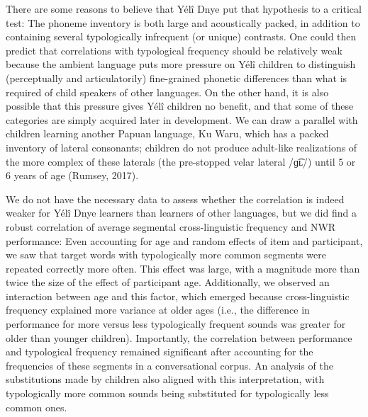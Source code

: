 \documentclass[
  american,
  ,man,floatsintext]{apa6}
\begin{document}
There are some reasons to believe that Yélî Dnye put that hypothesis to a critical test: The phoneme inventory is both large and acoustically packed, in addition to containing several typologically infrequent (or unique) contrasts. One could then predict that correlations with typological frequency should be relatively weak because the ambient language puts more pressure on Yélî children to distinguish (perceptually and articulatorily) fine-grained phonetic differences than what is required of child speakers of other languages. On the other hand, it is also possible that this pressure gives Yélî children no benefit, and that some of these categories are simply acquired later in development. We can draw a parallel with children learning another Papuan language, Ku Waru, which has a packed inventory of lateral consonants; children do not produce adult-like realizations of the more complex of these laterals (the pre-stopped velar lateral /ɡ͡ʟ/) until 5 or 6 years of age (Rumsey, 2017).

We do not have the necessary data to assess whether the correlation is indeed weaker for Yélî Dnye learners than learners of other languages, but we did find a robust correlation of average segmental cross-linguistic frequency and NWR performance: Even accounting for age and random effects of item and participant, we saw that target words with typologically more common segments were repeated correctly more often. This effect was large, with a magnitude more than twice the size of the effect of participant age. Additionally, we observed an interaction between age and this factor, which emerged because cross-linguistic frequency explained more variance at older ages (i.e., the difference in performance for more versus less typologically frequent sounds was greater for older than younger children). Importantly, the correlation between performance and typological frequency remained significant after accounting for the frequencies of these segments in a conversational corpus. An analysis of the substitutions made by children also aligned with this interpretation, with typologically more common sounds being substituted for typologically less common ones.
\end{document}
